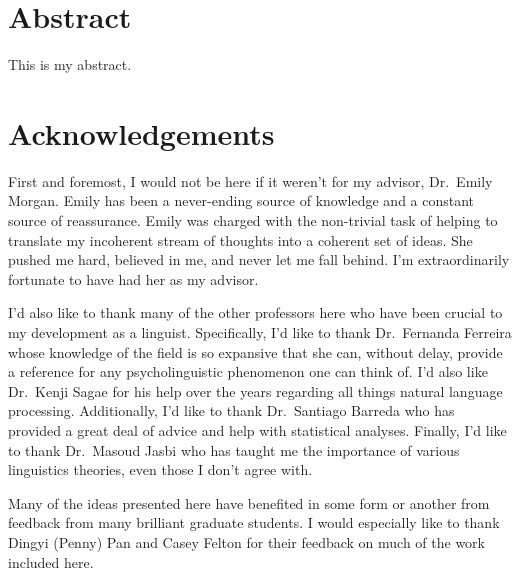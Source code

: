 \documentclass[
  12pt,
  letterpaper,
]{scrreprt}
\renewcommand*\contentsname{Table of contents}
\newcommand\contentsname{Table of contents}
\begin{document}
\setcounter{page}{\value{savedpage}} %
\clearpage
\renewcommand*\contentsname{Table of contents}
{
\setcounter{tocdepth}{2}
\tableofcontents
}
\listoffigures
\listoftables


\chapter*{Abstract}\label{sec-abstract}


This is my abstract.

\newpage


\chapter*{Acknowledgements}\label{sec-acknowledgements}


First and foremost, I would not be here if it weren't for my advisor,
Dr.~Emily Morgan. Emily has been a never-ending source of knowledge and
a constant source of reassurance. Emily was charged with the non-trivial
task of helping to translate my incoherent stream of thoughts into a
coherent set of ideas. She pushed me hard, believed in me, and never let
me fall behind. I'm extraordinarily fortunate to have had her as my
advisor.

I'd also like to thank many of the other professors here who have been
crucial to my development as a linguist. Specifically, I'd like to thank
Dr.~Fernanda Ferreira whose knowledge of the field is so expansive that
she can, without delay, provide a reference for any psycholinguistic
phenomenon one can think of. I'd also like Dr.~Kenji Sagae for his help
over the years regarding all things natural language processing.
Additionally, I'd like to thank Dr.~Santiago Barreda who has provided a
great deal of advice and help with statistical analyses. Finally, I'd
like to thank Dr.~Masoud Jasbi who has taught me the importance of
various linguistics theories, even those I don't agree with.

Many of the ideas presented here have benefited in some form or another
from feedback from many brilliant graduate students. I would especially
like to thank Dingyi (Penny) Pan and Casey Felton for their feedback on
much of the work included here.
\end{document}
